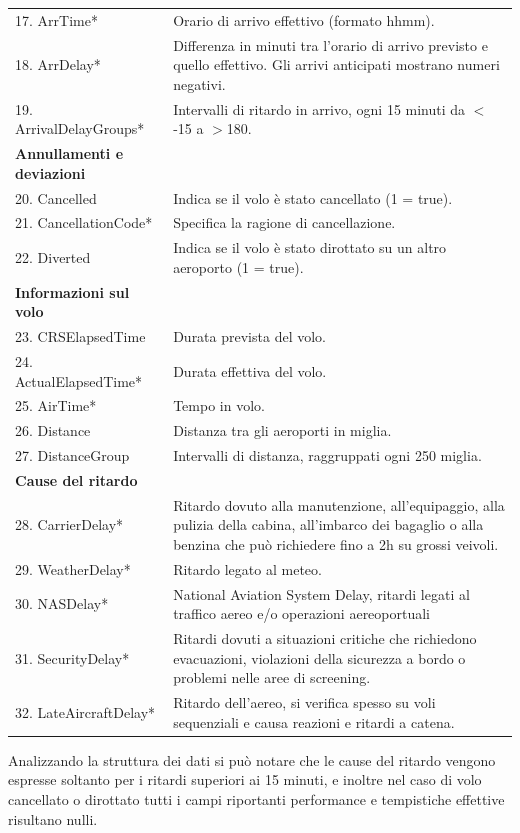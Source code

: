 \documentclass[12pt]{article}
\begin{document}
\begin{longtable}{ L{6.2cm} L{10.3cm} }
        17. ArrTime*&Orario di arrivo effettivo (formato hhmm).\\
        18. ArrDelay*&Differenza in minuti tra l'orario di arrivo previsto e quello effettivo. Gli arrivi anticipati mostrano numeri negativi. \\
        19. ArrivalDelayGroups*&Intervalli di ritardo in arrivo, ogni 15 minuti da $<$-15 a $>$180.\\
    \hline
        \textbf{Annullamenti e deviazioni}\\
        20. Cancelled&Indica se il volo è stato cancellato (1 = true).\\
        21. CancellationCode*&Specifica la ragione di cancellazione.\\
        22. Diverted&Indica se il volo è stato dirottato su un altro aeroporto (1 = true).\\
    \hline
        \textbf{Informazioni sul volo}\\
        23. CRSElapsedTime&Durata prevista del volo.\\
        24. ActualElapsedTime*&Durata effettiva del volo.\\
        25. AirTime*&Tempo in volo.\\ 
        26. Distance&Distanza tra gli aeroporti in miglia.\\
        27. DistanceGroup&Intervalli di distanza, raggruppati ogni 250 miglia.\\
    \hline
        \textbf{Cause del ritardo}\\
        28. CarrierDelay*&Ritardo dovuto alla manutenzione, all’equipaggio, alla pulizia della cabina, all’imbarco dei bagaglio o alla benzina che può richiedere fino a 2h su grossi veivoli.\\
        29. WeatherDelay*&Ritardo legato al meteo.\\
        30. NASDelay*&National Aviation System Delay, ritardi legati al traffico aereo e/o operazioni aereoportuali\\ 
        31. SecurityDelay*&Ritardi dovuti a situazioni critiche che  richiedono  evacuazioni,  violazioni della sicurezza a bordo o problemi nelle aree di screening.\\
        32. LateAircraftDelay*&Ritardo dell'aereo, si verifica spesso su voli sequenziali e causa reazioni e ritardi a catena.\\
\end{longtable}

\noindent Analizzando la struttura dei dati si può notare che le cause del ritardo vengono espresse soltanto per i ritardi superiori ai 15 minuti, e inoltre nel caso di volo cancellato o dirottato tutti i campi riportanti performance  e tempistiche effettive risultano nulli.
\restoregeometry
\end{document}
